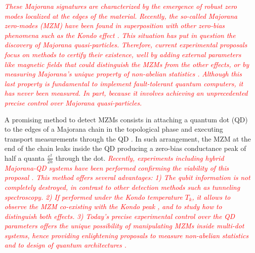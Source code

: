 \documentclass[showpacs,aps,prb,reprint,superscriptaddress]{revtex4-2}
\newcommand{\change}[1]{\textcolor{red}{\sl#1}}
\begin{document}
\change{These Majorana signatures are characterized by the emergence of robust zero modes localized at the edges of the material. Recently, the so-called Majorana zero-modes (MZM) have been found in superposition with other zero-bias phenomena such as the Kondo effect \cite{lee_zero-bias_2012}. This situation has put in question the discovery of Majorana quasi-particles. Therefore, current experimental proposals focus on methods to certify their existence, well by adding external parameters like magnetic fields that could distinguish the  MZMs from the other effects, or by measuring Majorana's unique property of non-abelian statistics \cite{aasen_milestones_2016,sarma_majorana_2015,heck_coulomb-assisted_2012}. Although this last property is fundamental to implement fault-tolerant quantum computers, it has never been measured. In part, because it involves achieving an unprecedented precise control over Majorana quasi-particles.}  





A promising method to detect MZMs consists in attaching a quantum dot (QD) to the edges of a Majorana chain in the topological phase and executing transport measurements through the QD \cite{liu_detecting_2011}.  In such arrangement, the MZM at the end of the chain leaks inside the QD \cite{vernek_subtle_2014} producing a zero-bias conductance peak of half a quanta $\frac{e^{2}}{2h}$ through the dot. \change{ Recently, experiments including hybrid Majorana-QD systems have been performed confirming the viability of this proposal\cite{deng_majorana_2016} . This method offers several advantages: 1) The qubit information  is not completely destroyed, in contrast to other detection methods such as tunneling spectroscopy. 2) If performed under the  Kondo temperature $T_k$, it allows to observe the MZM co-existing with the Kondo peak \cite{lee_kondo_2013,ruiz-tijerina_interaction_2015,gorski_interplay_2018} , and to study how to distinguish both effects. 3) Today's precise experimental control over the QD parameters offers the unique possibility of manipulating MZMs inside multi-dot systems, hence providing enlightening proposals to measure non-abelian statistics \cite{malciu_braiding_2018} and to design of quantum architectures  \cite{barkeshli_physical_2015,karzig_scalable_2017}. }
\end{document}
